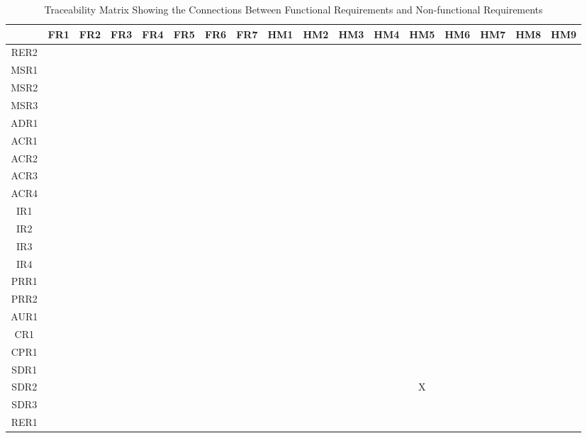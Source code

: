 \documentclass[12pt]{article}
\begin{document}
\begin{landscape}
\begin{table}[h!]
\centering
\begin{tabular}{|c|c|c|c|c|c|c|c|c|c|c|c|c|c|c|c|c|}
\hline
	& FR1 & FR2 & FR3 & FR4 & FR5 & FR6 & FR7 & HM1 & HM2 & HM3 & HM4 & HM5 & HM6 & HM7 & HM8 & HM9 \\
\hline
RER2        & & & & & & & & & & & & & & & & \\ \hline
MSR1        & & & & & & & & & & & & & & & & \\ \hline
MSR2        & & & & & & & & & & & & & & & & \\ \hline
MSR3        & & & & & & & & & & & & & & & & \\ \hline
ADR1        & & & & & & & & & & & & & & & & \\ \hline
ACR1        & & & & & & & & & & & & & & & & \\ \hline
ACR2        & & & & & & & & & & & & & & & & \\ \hline
ACR3        & & & & & & & & & & & & & & & & \\ \hline
ACR4        & & & & & & & & & & & & & & & & \\ \hline
IR1         & & & & & & & & & & & & & & & & \\ \hline
IR2         & & & & & & & & & & & & & & & & \\ \hline
IR3         & & & & & & & & & & & & & & & & \\ \hline
IR4         & & & & & & & & & & & & & & & & \\ \hline
PRR1        & & & & & & & & & & & & & & & & \\ \hline
PRR2        & & & & & & & & & & & & & & & & \\ \hline
AUR1        & & & & & & & & & & & & & & & & \\ \hline
CR1         & & & & & & & & & & & & & & & & \\ \hline
CPR1        & & & & & & & & & & & & & & & & \\ \hline
SDR1        & & & & & & & & & & & & & & & & \\ \hline
SDR2        & & & & & & & & & & & & X & & & & \\ \hline
SDR3        & & & & & & & & & & & & & & & & \\ \hline
RER1        & & & & & & & & & & & & & & & & \\ \hline

\end{tabular}
\caption{Traceability Matrix Showing the Connections Between Functional Requirements and Non-functional Requirements}
\label{Table:A_trace}
\end{table}
\end{landscape}
\end{document}

